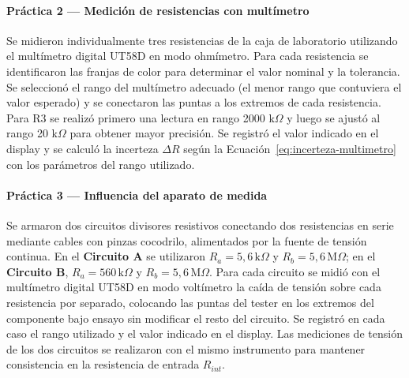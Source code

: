 \paragraph{Práctica 2 --- Medición de resistencias con multímetro}
Se midieron individualmente tres resistencias de la caja de laboratorio utilizando el multímetro digital UT58D en modo ohmímetro.
Para cada resistencia se identificaron las franjas de color para determinar el valor nominal y la tolerancia.
Se seleccionó el rango del multímetro adecuado (el menor rango que contuviera el valor esperado) y se conectaron las puntas a los extremos de cada resistencia.
Para R3 se realizó primero una lectura en rango 2000 k$\Omega$ y luego se ajustó al rango 20 k$\Omega$ para obtener mayor precisión.
Se registró el valor indicado en el display y se calculó la incerteza $\Delta R$ según la Ecuación~\ref{eq:incerteza-multimetro} con los parámetros del rango utilizado.

\paragraph{Práctica 3 --- Influencia del aparato de medida}

Se armaron dos circuitos divisores resistivos conectando dos resistencias en serie
mediante cables con pinzas cocodrilo, alimentados por la fuente de tensión continua.
En el \textbf{Circuito A} se utilizaron $R_a = 5{,}6\,\text{k}\Omega$ y
$R_b = 5{,}6\,\text{M}\Omega$; en el \textbf{Circuito B}, $R_a = 560\,\text{k}\Omega$
y $R_b = 5{,}6\,\text{M}\Omega$.
Para cada circuito se midió con el multímetro digital UT58D en modo voltímetro
la caída de tensión sobre cada resistencia por separado, colocando las puntas
del tester en los extremos del componente bajo ensayo sin modificar el resto del
circuito. Se registró en cada caso el rango utilizado y el valor indicado en el display.
Las mediciones de tensión de los dos circuitos se realizaron con el mismo instrumento
para mantener consistencia en la resistencia de entrada $R_{int}$.